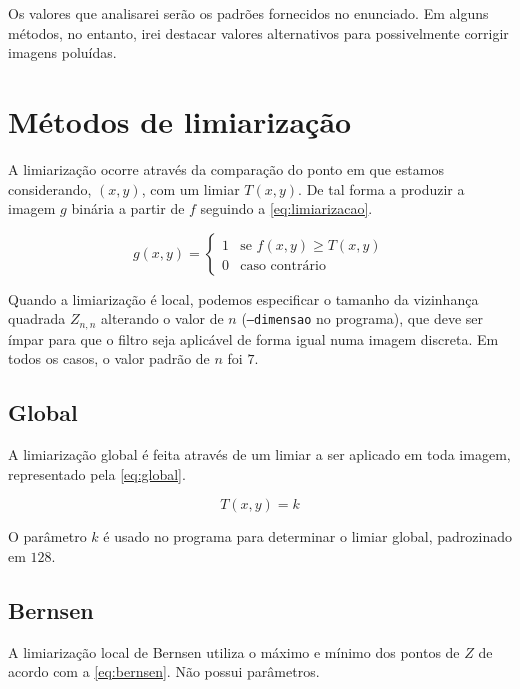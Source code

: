 \documentclass[brazilian,a4paper,twocolumn]{article}
\begin{document}
    Os valores que analisarei serão os padrões fornecidos no enunciado. Em alguns métodos, no entanto, irei destacar valores alternativos para possivelmente corrigir imagens poluídas.


\section{Métodos de limiarização}

    A limiarização ocorre através da comparação do ponto em que estamos considerando, $(x, y)$, com um limiar $T(x, y)$. De tal forma a produzir a imagem $g$ binária a partir de $f$ seguindo a \cref{eq:limiarizacao}.

    \begin{equation}
    \label{eq:limiarizacao}
        g(x, y) =
        \begin{cases}
            1       & \text{se $f(x, y) \geq T(x, y)$} \\
            0       & \text{caso contrário}
        \end{cases}
    \end{equation}

    Quando a limiarização é local, podemos especificar o tamanho da vizinhança quadrada $Z_{n,n}$ alterando o valor de $n$ (\texttt{--dimensao} no programa), que deve ser ímpar para que o filtro seja aplicável de forma igual numa imagem discreta. Em todos os casos, o valor padrão de $n$ foi $7$.

    \subsection{Global}

        A limiarização global é feita através de um limiar a ser aplicado em toda imagem, representado pela \cref{eq:global}.

        \begin{equation}
        \label{eq:global}
            T(x, y) = k
        \end{equation}

        O parâmetro $k$ é usado no programa para determinar o limiar global, padrozinado em $128$.

    \subsection{Bernsen}

        A limiarização local de Bernsen utiliza o máximo e mínimo dos pontos de $Z$ de acordo com a \cref{eq:bernsen}. Não possui parâmetros.
\end{document}
